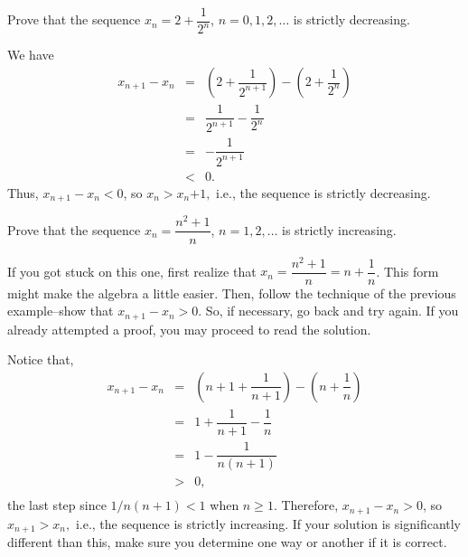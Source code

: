 \begin{exa}
Prove that the sequence $x_n = 2 + \dfrac{1}{2^n}$, $n =0, 1, 2,
\ldots$ is strictly decreasing.
 \begin{pf}   We have $$\begin{array}{lll}x_{n + 1} - x_n & = & \left(2
+ \dfrac{1}{2^{n+1}} \right) - \left(2 +
\dfrac{1}{2^n}\right) \\
& = & \dfrac{1}{2^{n+1}} -\dfrac{1}{2^n} \\
& = & -\dfrac{1}{2^{n+1}} \\
& < & 0.
\end{array}$$
Thus, $x_{n + 1} - x_n < 0$, so $x_n > x_n{+1},$
i.e., the sequence is strictly decreasing.
\end{pf}
\end{exa}

\begin{exer}
Prove that the sequence $x_n = \dfrac{n^2 + 1}{n}$, $n = 1, 2,
\ldots$ is strictly increasing.

\vspace*{3.1in}
\begin{answer}
If you got stuck on this one, first realize that $x_n=\dfrac{n^2 + 1}{n} = n + \dfrac{1}{n}$.
This form might make the algebra a little easier.  
Then, follow the technique of the previous example--show that
$x_{n + 1} - x_n >0$.  So, if necessary, go back and try again.
If you already attempted a proof, you may proceed to read the solution.

Notice that, $$ \begin{array}{lll}x_{n + 1} - x_n & = & \left(n + 1 +
\dfrac{1}{n + 1}\right) -\left(n  + \dfrac{1}{n
}\right) \\
& = & 1 + \dfrac{1}{n + 1} - \dfrac{1}{n} \\
& = & 1 -\dfrac{1}{n(n +1)} \\
& > & 0,\\
\end{array}$$
the last step since  $1/n(n+1)<1$ when $n\geq 1$.
Therefore, $x_{n + 1} - x_n > 0$, so $x_{n + 1}> x_n,$
i.e., the sequence is strictly increasing.
If your solution is significantly different than this, make sure you determine one way or another
if it is correct.
\end{answer}
\end{exer}


